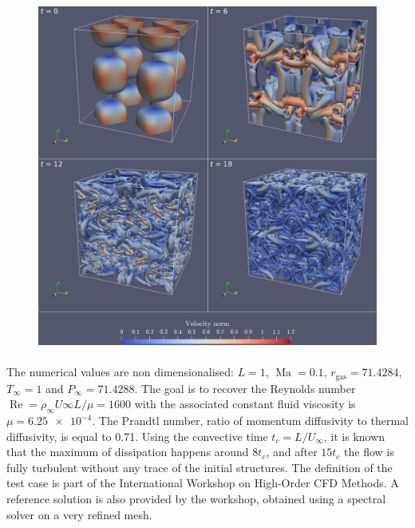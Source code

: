       \begin{figure}
        \centering
        \includegraphics[width=\textwidth]{figures/tgv_fields.png}
        \caption{}
        \label{fig:tgv_fields}
      \end{figure}

      \paragraph{}
      The numerical values are non dimensionalised: $L = 1$, $\operatorname{Ma} = 0.1$, $r_\textrm{gas} = 71.4284$, $T_\infty = 1$ and $P_\infty = 71.4288$.
      The goal is to recover the Reynolds number $\operatorname{Re} = \rho_\infty U\infty L / \mu = 1600$ with the associated constant fluid viscosity is $\mu = \num{6.25e-4}$.
      The Prandtl number, ratio of momentum diffusivity to thermal diffusivity, is equal to 0.71.
      Using the convective time $t_c = L / U_\infty$, it is known that the maximum of dissipation happens around $8 t_c$, and after $15 t_c$ the flow is fully turbulent without any trace of the initial structures.
      The definition of the test case is part of the International Workshop on High-Order CFD Methods.
      A reference solution is also provided by the workshop, obtained using a spectral solver on a very refined mesh.

